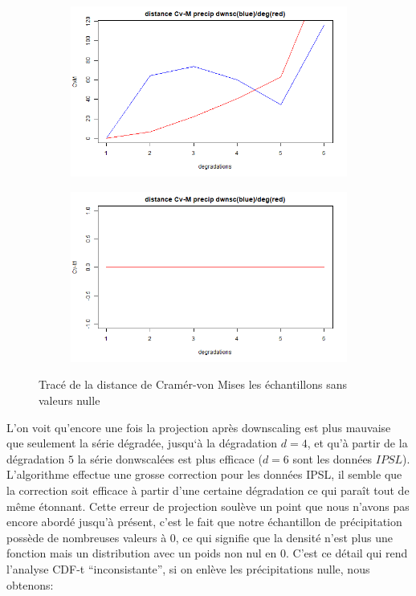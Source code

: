 \documentclass[a4paper,11pt]{article}
\begin{document}
\vspace{0.5cm}

\begin{figure}[!h]
	\label{fig: res - CVM }
	\centering
	\begin{subfigure}[b]{0.45\textwidth}
		\includegraphics[scale=0.4]{images/Dist_CVM_precip.png}
	\end{subfigure}
	\hfill
	\begin{subfigure}[b]{0.45\textwidth}
		\includegraphics[scale=0.4]{images/Dist_CVM_evap.png}
	\end{subfigure}
	\caption{Tracé de la distance de Cramér-von Mises les échantillons sans valeurs nulle}
\end{figure}


L'on voit qu'encore une fois la projection après downscaling est plus mauvaise que seulement la série dégradée, jusqu`à la dégradation $d=4$, et qu'à partir de la dégradation $5$ la série donwscalées est plus efficace ($d=6$ sont les données $IPSL$). L'algorithme effectue une grosse correction pour les données IPSL, il semble que la correction soit efficace à partir d'une certaine dégradation ce qui paraît tout de même étonnant. Cette erreur de projection soulève un point que nous n'avons pas encore abordé jusqu'à présent, c'est le fait que notre échantillon de précipitation possède de nombreuses valeurs à $0$, ce qui signifie que la densité n'est plus une fonction mais un distribution avec un poids non nul en $0$. C'est ce détail qui rend l'analyse CDF-t ``inconsistante'', si on enlève les précipitations nulle, nous obtenons:
\end{document}
